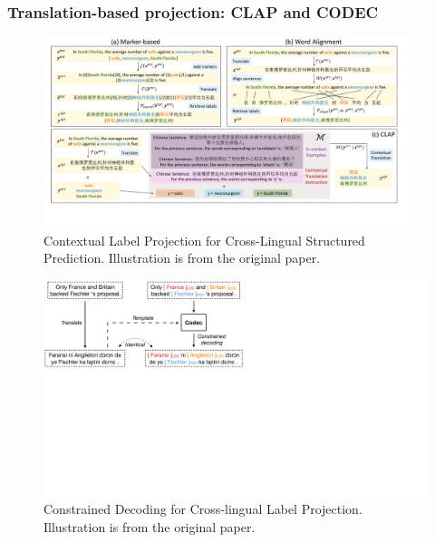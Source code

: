 \documentclass{beamer}
\begin{document}
\begin{frame}
  \frametitle{Translation-based projection: CLAP and CODEC}
  \begin{figure}
    \includegraphics[width=0.95\textwidth, clip, trim=0cm 0cm 0cm 12.5cm]{ClAP_marker_align.pdf}
    \caption{Contextual Label Projection for Cross-Lingual Structured Prediction. Illustration is from the original paper.}
  \end{figure}
  \begin{figure}
    \includegraphics[height=0.3\textheight]{CODEC.pdf}
    \caption{Constrained Decoding for Cross-lingual Label Projection. Illustration is from the original paper.}
  \end{figure}
\end{frame}
\end{document}
